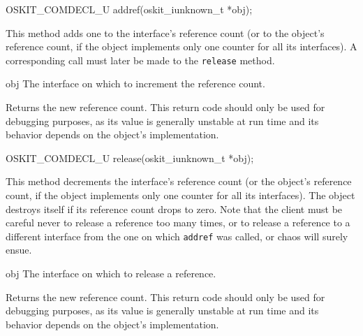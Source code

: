 \begin{apisyn}

	\funcproto OSKIT_COMDECL_U addref(oskit_iunknown_t *obj);
\end{apisyn}
\begin{apidesc}
	This method adds one to the interface's reference count
	(or to the object's reference count,
	if the object implements only one counter for all its interfaces).
	A corresponding call must later be made to the \texttt{release} method.
\end{apidesc}
\begin{apiparm}
	\item[obj]
		The interface on which to increment the reference count.
\end{apiparm}
\begin{apiret}
	Returns the new reference count.
	This return code should only be used for debugging purposes,
	as its value is generally unstable at run time
	and its behavior depends on the object's implementation.
\end{apiret}

\begin{apisyn}

	\funcproto OSKIT_COMDECL_U release(oskit_iunknown_t *obj);
\end{apisyn}
\begin{apidesc}
	This method decrements the interface's reference count
	(or the object's reference count,
	if the object implements only one counter for all its interfaces).
	The object destroys itself if its reference count drops to zero.
	Note that the client must be careful
	never to release a reference too many times,
	or to release a reference to a different interface
	from the one on which \texttt{addref} was called,
	or chaos will surely ensue.
\end{apidesc}
\begin{apiparm}
	\item[obj]
		The interface on which to release a reference.
\end{apiparm}
\begin{apiret}
	Returns the new reference count.
	This return code should only be used for debugging purposes,
	as its value is generally unstable at run time
	and its behavior depends on the object's implementation.
\end{apiret}


